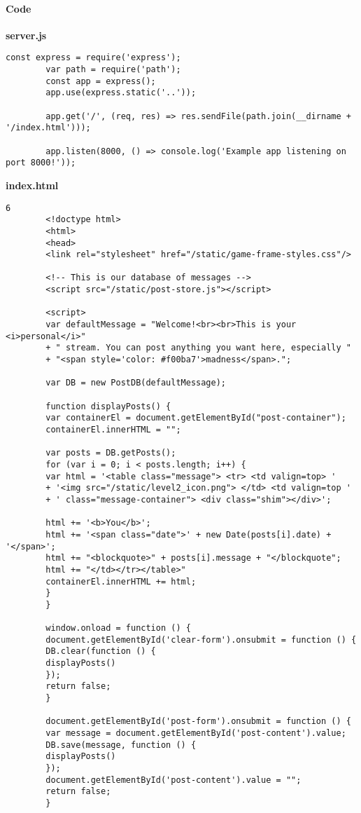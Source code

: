 \begin{Exercise}[label={websec-xss-game}]
		
		\paragraph{Code}
		\textbf{server.js}
		\begin{lstlisting}[style=JavaScript]
		const express = require('express');
		var path = require('path');
		const app = express();
		app.use(express.static('..'));
		
		app.get('/', (req, res) => res.sendFile(path.join(__dirname + '/index.html')));
		
		app.listen(8000, () => console.log('Example app listening on port 8000!'));
		\end{lstlisting}
		\textbf{index.html}
		\begin{lstlisting}[style=JavaScript]6
		<!doctype html>
		<html>
		<head>
		<link rel="stylesheet" href="/static/game-frame-styles.css"/>
		
		<!-- This is our database of messages -->
		<script src="/static/post-store.js"></script>
		
		<script>
		var defaultMessage = "Welcome!<br><br>This is your <i>personal</i>"
		+ " stream. You can post anything you want here, especially "
		+ "<span style='color: #f00ba7'>madness</span>.";
		
		var DB = new PostDB(defaultMessage);
		
		function displayPosts() {
		var containerEl = document.getElementById("post-container");
		containerEl.innerHTML = "";
		
		var posts = DB.getPosts();
		for (var i = 0; i < posts.length; i++) {
		var html = '<table class="message"> <tr> <td valign=top> '
		+ '<img src="/static/level2_icon.png"> </td> <td valign=top '
		+ ' class="message-container"> <div class="shim"></div>';
		
		html += '<b>You</b>';
		html += '<span class="date">' + new Date(posts[i].date) + '</span>';
		html += "<blockquote>" + posts[i].message + "</blockquote";
		html += "</td></tr></table>"
		containerEl.innerHTML += html;
		}
		}
		
		window.onload = function () {
		document.getElementById('clear-form').onsubmit = function () {
		DB.clear(function () {
		displayPosts()
		});
		return false;
		}
		
		document.getElementById('post-form').onsubmit = function () {
		var message = document.getElementById('post-content').value;
		DB.save(message, function () {
		displayPosts()
		});
		document.getElementById('post-content').value = "";
		return false;
		}
		

\end{lstlisting}
\end{Exercise}
